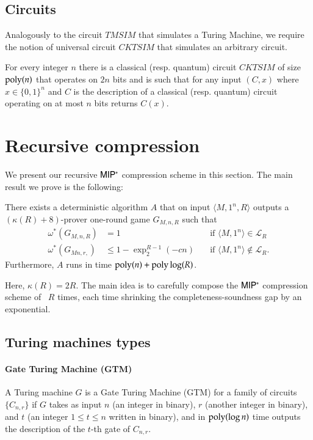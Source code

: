 \documentclass[11pt,letterpaper]{article}
\newcommand{\hnote}[1]{\todo[inline, color=green!30]{\small{Henry: #1}}}
\newcommand{\MIPstar}{{\sf MIP^*}}
\begin{document}
\subsection{Circuits}

Analogously to the circuit $TMSIM$ that simulates a Turing Machine, we require the notion of universal circuit $CKTSIM$ that simulates an arbitrary circuit. 

\begin{lemma}\label{lem:cktsim}
For every integer $n$ there is a classical (resp. quantum) circuit $CKTSIM$ of size $\operatorname{poly}(n)$ that operates on $2n$ bits and is such that for any input $(C,x)$ where $x\in\{0,1\}^n$ and $C$ is the description of a classical (resp. quantum) circuit operating on at most $n$ bits returns $C(x)$. 
\end{lemma}


\section{Recursive compression}

We present our recursive $\MIPstar$ compression scheme in this section. The main result we prove is the following:

\begin{theorem}
	There exists a deterministic algorithm $A$ that on input $\langle M, 1^n, R \rangle$ outputs a $(\kappa(R) + 8)$-prover one-round game $G_{M,n,R}$ such that 
\begin{align*}
		\omega^*(G_{M,n,R}) &= 1  \quad & \text{if } \langle M,1^n \rangle\in \mathcal{L}_R \\
		\omega^*(G_{Mn,r,}) &\leq 1 - \exp^{R-1}_2(-cn) \quad &\text{if } \langle M,1^n \rangle\notin \mathcal{L}_R.
\end{align*}
Furthermore, $A$ runs in time $\operatorname{poly}(n) + \operatorname{poly}\log(R)$.	
\end{theorem}

Here, $\kappa(R) = 2R$. \hnote{Subject to change.} The main idea is to carefully compose the $\MIPstar$ compression scheme of~\cite{ji2016compression} $R$ times, each time shrinking the completeness-soundness gap by an exponential. 

\subsection{Turing machines types}

\paragraph{Gate Turing Machine (GTM)} A Turing machine $G$ is a Gate Turing Machine (GTM) for a family of circuits $\{C_{n,r}\}$ if $G$ takes as input $n$ (an integer in binary), $r$ (another integer in binary), and $t$ (an integer $1\leq t\leq n$ written in binary), and in $\operatorname{poly}(\log n)$ time outputs the description of the $t$-th gate of $C_{n,r}$. 
\end{document}
